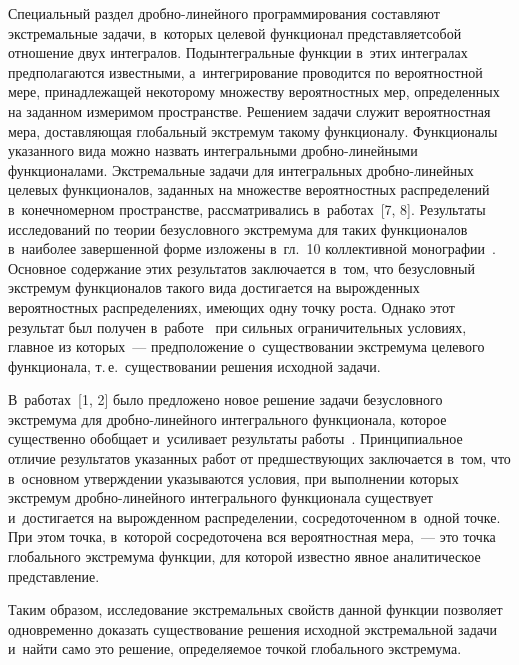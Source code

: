 \begin{multicols}{2}
     Специальный раздел дроб\-но-ли\-ней\-но\-го программирования 
со\-став\-ля\-ют экстремальные задачи, в~которых целевой функционал 
пред\-став\-ля\-ет\linebreak собой отношение двух интегралов. Подынтегральные функции 
в~этих интегралах предполагаются известными, а~интегрирование проводится 
по вероятностной мере, принадлежащей некоторому множеству вероятностных 
мер, определенных на заданном измеримом пространстве. Решением задачи 
служит вероятностная мера, до\-став\-ля\-ющая глобальный экстремум такому 
функ\-ци\-о\-на\-лу. Функционалы указанного вида можно назвать интегральными 
дроб\-но-ли\-ней\-ны\-ми функционалами. Экстремальные задачи для 
интегральных дроб\-но-ли\-ней\-ных целевых функционалов, заданных на 
множестве вероятностных распределений в~конечномерном про\-стран\-ст\-ве, 
рассматривались в~работах~[7, 8]. Результаты  
исследований по тео\-рии безуслов\-но\-го экстремума для таких функционалов 
в~наиболее завершенной форме изложены в~гл.~10 коллективной 
монографии~\cite{8-shn}. Основное содержание этих результатов заключается 
в~том, что безусловный экстремум функционалов такого вида достигается на 
вырожденных вероятностных распределениях, име\-ющих одну точ\-ку рос\-та. 
Однако этот результат был получен в~работе~\cite{8-shn} при сильных 
ограничительных условиях, главное из которых~--- предположение 
о~существовании экстремума целевого функционала, т.\,е.\ существовании 
решения исходной задачи. 

В~работах~[1, 2] было предложено 
новое решение задачи без\-услов\-но\-го экстремума для дроб\-но-ли\-ней\-но\-го 
интегрального функционала, которое существенно обобщает и~усиливает 
результаты работы~\cite{8-shn}. Принципиальное отличие результатов 
указанных работ от пред\-ше\-ст\-ву\-ющих за\-клю\-ча\-ет\-ся в~том, что в~основном 
утверж\-де\-нии указываются условия, при выполнении которых экстремум 
дроб\-но-ли\-ней\-но\-го интегрального функционала существует и~достигается на 
вы\-рож\-ден\-ном распределении, сосредоточенном в~одной точке. При этом точка, 
в~которой сосредоточена вся вероятностная мера,~--- это точка глобального 
экстремума функ\-ции, для которой известно явное аналитическое 
представление. 
     
     Таким образом, исследование экстремальных свойств данной функции 
позволяет одновременно доказать существование решения исходной 
экстремальной задачи и~найти само это решение, опре\-де\-ля\-емое точ\-кой 
глобального экстремума. 
     

\end{multicols}
